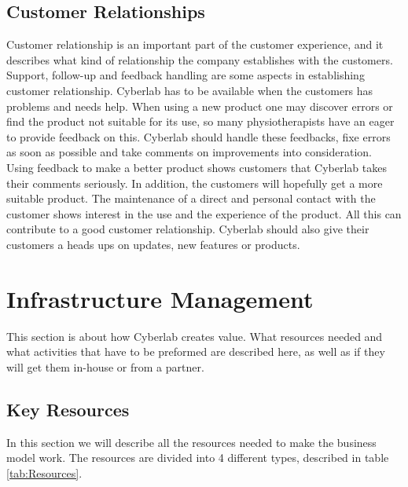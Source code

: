 \subsection{Customer Relationships}
Customer relationship is an important part of the customer experience, and it describes what kind of relationship the company establishes with the customers. Support, follow-up and feedback handling are some aspects in establishing customer relationship. Cyberlab has to be available when the customers has problems and needs help. When using a new product one may discover errors or find the product not suitable for its use, so many physiotherapists have an eager to provide feedback on this. Cyberlab should handle these feedbacks, fixe errors as soon as possible and take comments on improvements into consideration. Using feedback to make a better product shows customers that Cyberlab takes their comments seriously.  In addition, the customers will hopefully get a more suitable product. The maintenance of a direct and personal contact with the customer shows interest in the use and the experience of the product. All this can contribute to a good customer relationship. Cyberlab should also give their customers a heads ups on updates, new features or products.
\section{Infrastructure Management}
This section is about how Cyberlab creates value. What resources needed and what activities that have to be preformed are described here, as well as if they will get them in-house or from a partner. 

\subsection{Key Resources}

In this section we will describe all the resources needed to make the business model work. The resources are divided into 4 different types, described in table \ref{tab:Resources}.
\newpage

